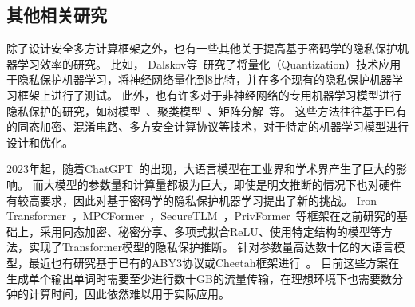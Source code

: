 \subsection{其他相关研究}
除了设计安全多方计算框架之外，也有一些其他关于提高基于密码学的隐私保护机器学习效率的研究。
%
比如，
Dalskov等~\cite{dalskov2020secure_q8}研究了将量化（Quantization）技术应用于隐私保护机器学习，将神经网络量化到8比特，并在多个现有的隐私保护机器学习框架上进行了测试。
%
此外，也有许多对于非神经网络的专用机器学习模型进行隐私保护的研究，如树模型~\cite{wu2020vf_tree,fang2021secure_xgb,lu2023squirrel}、聚类模型~\cite{bunn2007secure_kmeans,wu2020secure_kmeans}、矩阵分解~\cite{nikolaenko2013ppmf,kim2018ppmf}等。
%
这些方法往往基于已有的同态加密、混淆电路、多方安全计算协议等技术，对于特定的机器学习模型进行设计和优化。
%


2023年起，随着ChatGPT~\cite{chatgpt}的出现，大语言模型在工业界和学术界产生了巨大的影响。
%
而大模型的参数量和计算量都极为巨大，即使是明文推断的情况下也对硬件有较高要求，因此对基于密码学的隐私保护机器学习提出了新的挑战。
%
Iron Transformer~\cite{hao2022iron}，MPCFormer~\cite{li2022mpcformer}，SecureTLM~\cite{chen2024securetlm}，PrivFormer~\cite{akimoto2023privformer}等框架在之前研究的基础上，采用同态加密、秘密分享、多项式拟合ReLU、使用特定结构的模型等方法，实现了Transformer模型的隐私保护推断。
%
针对参数量高达数十亿的大语言模型，最近也有研究基于已有的ABY3协议或Cheetah框架进行~\cite{dong2023puma,lu2023bumblebee,hou2023ciphergpt}。
目前这些方案在生成单个输出单词时需要至少进行数十GB的流量传输，在理想环境下也需要数分钟的计算时间，因此依然难以用于实际应用。




